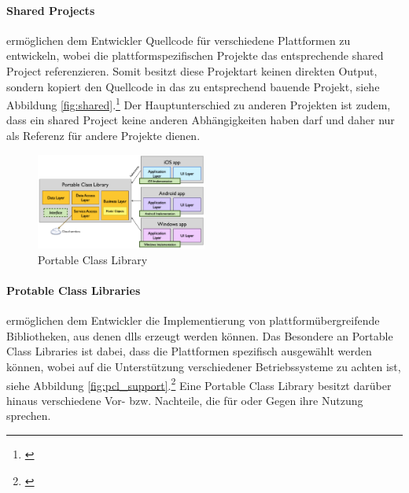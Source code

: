 \paragraph{Shared Projects}

ermöglichen dem Entwickler Quellcode für verschiedene Plattformen zu entwickeln, wobei die plattformspezifischen Projekte das entsprechende shared Project referenzieren. Somit besitzt diese Projektart keinen direkten Output, sondern kopiert den Quellcode in das zu entsprechend bauende Projekt, siehe Abbildung \eqref{fig:shared}.\footnote{\citep[vgl.][Shared Projects - Xamarin]{Xamarin.SharedProjects}\label{note4}} Der Hauptunterschied zu anderen Projekten ist zudem, dass ein shared Project keine anderen Abhängigkeiten haben darf und daher nur als Referenz für andere Projekte dienen.

\begin{figure}
	\begin{center}
		\includegraphics[width=0.5\textwidth]{images/technische_grundlagen/PortableClassLibrary.png}
	\end{center}
	\caption{Portable Class Library}
	\label{fig:portable}
\end{figure}

\paragraph{Protable Class Libraries}

ermöglichen dem Entwickler die Implementierung von plattformübergreifende Bibliotheken, aus denen \glspl{dll} erzeugt werden können. Das Besondere an Portable Class Libraries ist dabei, dass die Plattformen spezifisch ausgewählt werden können, wobei auf die Unterstützung verschiedener Betriebssysteme zu achten ist, siehe Abbildung \eqref{fig:pcl_support}.\footnote{\citep[vgl.][Introduction to Portable Class Libraries - Xamarin]{Xamarin.PortableClass}\label{note5}} Eine Portable Class Library besitzt darüber hinaus verschiedene Vor- bzw. Nachteile, die für oder Gegen ihre Nutzung sprechen.\\

